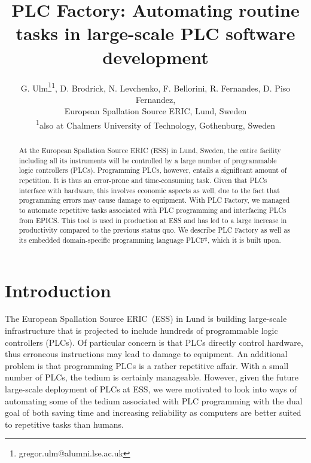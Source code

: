 \documentclass[a4paper,
              ]{jacow}
\begin{document}
\title{ PLC Factory: Automating routine tasks in large-scale PLC software development}

\author{G. Ulm\thanks{gregor.ulm@alumni.lse.ac.uk}\textsuperscript{1}, D. Brodrick, N. Levchenko, F. Bellorini, R. Fernandes, D. Piso Fernandez,\\ European Spallation Source ERIC, Lund, Sweden\\
		\textsuperscript{1}also at Chalmers University of Technology, Gothenburg, Sweden
		}
	
\maketitle



\begin{abstract}
At the European Spallation Source ERIC (ESS) in Lund, Sweden, the entire facility including all its instruments will be controlled by a large number of programmable logic controllers (PLCs). Programming PLCs, however, entails a significant amount of repetition. It is thus an error-prone and time-consuming task. Given that PLCs interface with hardware, this involves economic aspects as well, due to the fact that programming errors may cause damage to equipment. With PLC Factory, we managed to automate repetitive tasks associated with PLC programming and interfacing PLCs from EPICS. This tool is used in production at ESS and has led to a large increase in productivity compared to the previous status quo. We describe PLC Factory as well as its embedded domain-specific programming language PLCF$^\sharp$, which it is built upon.
\end{abstract}



\section{Introduction}
The European Spallation Source ERIC~(ESS) in Lund is building large-scale infrastructure that is projected to include hundreds of programmable logic controllers (PLCs). Of particular concern is that PLCs directly control hardware, thus erroneous instructions may lead to damage to equipment. An additional problem is that programming PLCs is a rather repetitive affair. With a small number of PLCs, the tedium is certainly manageable. However, given the future large-scale deployment of PLCs at ESS, we were motivated to look into ways of automating some of the tedium associated with PLC programming with the dual goal of both saving time and increasing reliability as computers are better suited to repetitive tasks than humans.
\end{document}
